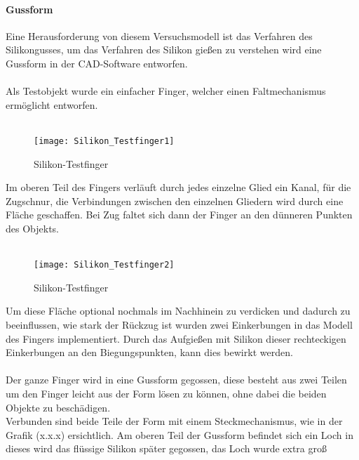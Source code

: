 \documentclass[titlepage,12pt,twoside]{article}
\begin{document}
\paragraph{Gussform}
\label{par:Gussform}
\hfill \break
\hfill \break
Eine Herausforderung von diesem Versuchsmodell ist das Verfahren des Silikongusses, um das Verfahren des Silikon gießen zu verstehen wird eine Gussform in der CAD-Software entworfen. \\
\\
Als Testobjekt wurde ein einfacher Finger, welcher einen Faltmechanismus ermöglicht entworfen. \\
\\
\begin{figure}[H]
	\begin{center}
		\scalebox{1.2}
		{\texttt{[image: Silikon\_Testfinger1]}}
		\caption{Silikon-Testfinger}
		\label{fig:Silikon_Testfinger1}			
	\end{center}
\end{figure}
\hfill \break
Im oberen Teil des Fingers verläuft durch jedes einzelne Glied ein Kanal, für die Zugschnur, die Verbindungen zwischen den einzelnen Gliedern wird durch eine Fläche geschaffen. Bei Zug faltet sich dann der Finger an den dünneren Punkten des Objekts. \\
\\
\begin{figure}[H]
	\begin{center}
		\scalebox{1.2}
		{\texttt{[image: Silikon\_Testfinger2]}}
		\caption{Silikon-Testfinger}
		\label{fig:Silikon_Testfinger2}			
	\end{center}
\end{figure}
\hfill \break
Um diese Fläche optional nochmals im Nachhinein zu verdicken und dadurch zu beeinflussen, wie stark der Rückzug ist wurden zwei Einkerbungen in das Modell des Fingers implementiert. Durch das Aufgießen mit Silikon dieser rechteckigen Einkerbungen 
an den Biegungspunkten, kann dies bewirkt werden. \\
\\
Der ganze Finger wird in eine Gussform gegossen, diese besteht aus zwei Teilen um den Finger leicht aus der Form lösen zu können, ohne dabei die beiden Objekte zu beschädigen. \\
Verbunden sind beide Teile der Form mit einem Steckmechanismus, wie in der Grafik (x.x.x) ersichtlich. Am oberen Teil der Gussform befindet sich ein Loch in dieses wird das flüssige Silikon später gegossen, das Loch wurde extra groß 
\end{document}
